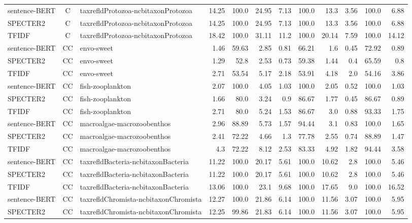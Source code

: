 \begin{table}[h]
\begin{tabular}{|l|c|l|r|r|r|r|r|r|r|r|r|}
	sentence-BERT  & C & taxrefldProtozoa-ncbitaxonProtozoa  & 14.25 & 100.0 & 24.95 & 7.13 & 100.0 & 13.3 & 3.56 & 100.0 & 6.88\\
	SPECTER2  & C & taxrefldProtozoa-ncbitaxonProtozoa  & 14.25 & 100.0 & 24.95 & 7.13 & 100.0 & 13.3 & 3.56 & 100.0 & 6.88\\
	TFIDF  & C & taxrefldProtozoa-ncbitaxonProtozoa  & 18.42 & 100.0 & 31.11 & 11.2 & 100.0 & 20.14 & 7.59 & 100.0 & 14.12\\
	\hline
	sentence-BERT  & CC & envo-sweet  & 1.46 & 59.63 & 2.85 & 0.81 & 66.21 & 1.6 & 0.45 & 72.92 & 0.89\\
	SPECTER2  & CC & envo-sweet  & 1.29 & 52.8 & 2.53 & 0.73 & 59.38 & 1.44 & 0.4 & 65.59 & 0.8\\
	TFIDF  & CC & envo-sweet  & 2.71 & 53.54 & 5.17 & 2.18 & 53.91 & 4.18 & 2.0 & 54.16 & 3.86\\
	\hline
	sentence-BERT  & CC & fish-zooplankton  & 2.07 & 100.0 & 4.05 & 1.03 & 100.0 & 2.05 & 0.52 & 100.0 & 1.03\\
	SPECTER2  & CC & fish-zooplankton  & 1.66 & 80.0 & 3.24 & 0.9 & 86.67 & 1.77 & 0.45 & 86.67 & 0.89\\
	TFIDF  & CC & fish-zooplankton  & 2.71 & 80.0 & 5.24 & 1.53 & 86.67 & 3.0 & 0.88 & 93.33 & 1.75\\
	\hline
	sentence-BERT  & CC & macroalgae-macrozoobenthos  & 2.96 & 88.89 & 5.73 & 1.57 & 94.44 & 3.1 & 0.83 & 100.0 & 1.65\\
	SPECTER2  & CC & macroalgae-macrozoobenthos  & 2.41 & 72.22 & 4.66 & 1.3 & 77.78 & 2.55 & 0.74 & 88.89 & 1.47\\
	TFIDF  & CC & macroalgae-macrozoobenthos  & 4.3 & 72.22 & 8.12 & 2.53 & 83.33 & 4.92 & 1.82 & 94.44 & 3.58\\
	\hline
	sentence-BERT  & CC & taxrefldBacteria-ncbitaxonBacteria  & 11.22 & 100.0 & 20.17 & 5.61 & 100.0 & 10.62 & 2.8 & 100.0 & 5.46\\
	SPECTER2  & CC & taxrefldBacteria-ncbitaxonBacteria  & 11.22 & 100.0 & 20.17 & 5.61 & 100.0 & 10.62 & 2.8 & 100.0 & 5.46\\
	TFIDF  & CC & taxrefldBacteria-ncbitaxonBacteria  & 13.06 & 100.0 & 23.1 & 9.68 & 100.0 & 17.65 & 9.0 & 100.0 & 16.52\\
	\hline
	sentence-BERT  & CC & taxrefldChromista-ncbitaxonChromista  & 12.27 & 100.0 & 21.86 & 6.14 & 100.0 & 11.56 & 3.07 & 100.0 & 5.95\\
	SPECTER2  & CC & taxrefldChromista-ncbitaxonChromista  & 12.25 & 99.86 & 21.83 & 6.14 & 100.0 & 11.56 & 3.07 & 100.0 & 5.95\\

\end{tabular}
\end{table}
